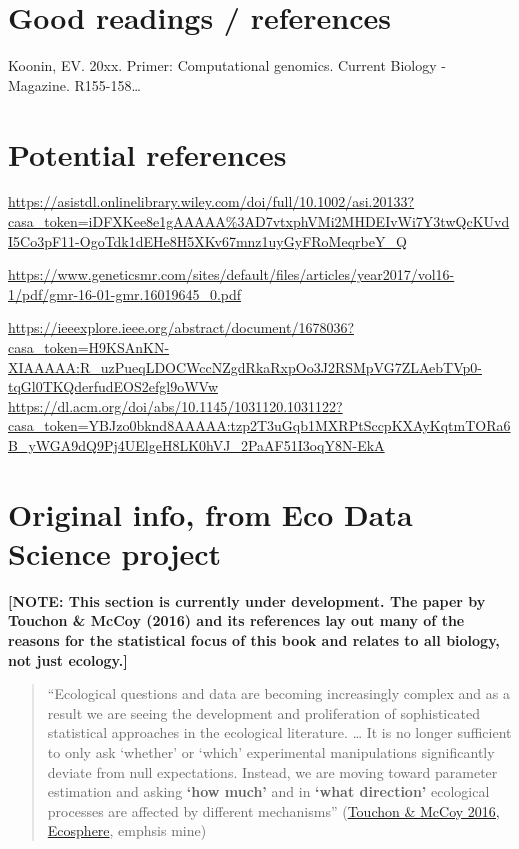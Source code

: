 \documentclass[
]{book}
\begin{document}
\hypertarget{good-readings-references}{%
\section{Good readings / references}\label{good-readings-references}}

Koonin, EV. 20xx. Primer: Computational genomics. Current Biology - Magazine. R155-158\ldots{}

\hypertarget{potential-references}{%
\section{Potential references}\label{potential-references}}

\url{https://asistdl.onlinelibrary.wiley.com/doi/full/10.1002/asi.20133?casa_token=iDFXKee8e1gAAAAA\%3AD7vtxphVMi2MHDEIvWi7Y3twQcKUvdI5Co3pF11-OgoTdk1dEHe8H5XKv67mnz1uyGyFRoMeqrbeY_Q}

\url{https://www.geneticsmr.com/sites/default/files/articles/year2017/vol16-1/pdf/gmr-16-01-gmr.16019645_0.pdf}

\url{https://ieeexplore.ieee.org/abstract/document/1678036?casa_token=H9KSAnKN-XIAAAAA:R_uzPueqLDOCWccNZgdRkaRxpOo3J2RSMpVG7ZLAebTVp0-tqGl0TKQderfudEOS2efgl9oWVw}
\url{https://dl.acm.org/doi/abs/10.1145/1031120.1031122?casa_token=YBJzo0bknd8AAAAA:tzp2T3uGqb1MXRPtSccpKXAyKqtmTORa6B_yWGA9dQ9Pj4UElgeH8LK0hVJ_2PaAF51I3oqY8N-EkA}

\hypertarget{original-info-from-eco-data-science-project}{%
\section{Original info, from Eco Data Science project}\label{original-info-from-eco-data-science-project}}

\textbf{{[}NOTE: This section is currently under development. The paper by Touchon \& McCoy (2016) and its references lay out many of the reasons for the statistical focus of this book and relates to all biology, not just ecology.{]}}

\begin{quote}
``Ecological questions and data are becoming increasingly complex and as a result we are seeing the development and proliferation of sophisticated statistical approaches in the ecological literature. \ldots{} It is no longer sufficient to only ask `whether' or `which' experimental manipulations significantly deviate from null expectations. Instead, we are moving toward parameter estimation and asking \textbf{`how much'} and in \textbf{`what direction'} ecological processes are affected by different mechanisms'' (\href{https://esajournals.onlinelibrary.wiley.com/doi/abs/10.1002/ecs2.1394}{Touchon \& McCoy 2016, Ecosphere}, emphsis mine)
\end{quote}
\end{document}
